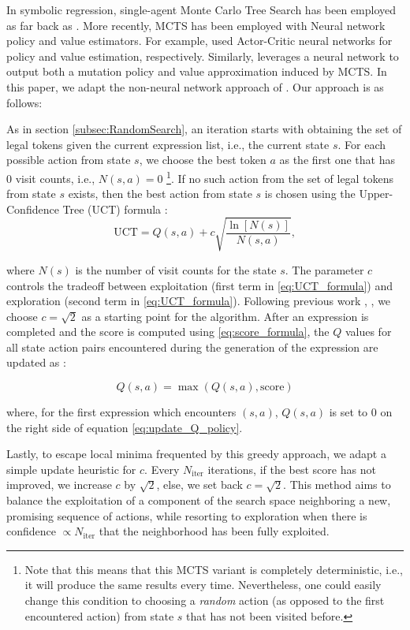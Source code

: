 \documentclass[runningheads]{llncs}
\begin{document}
In symbolic regression, single-agent Monte Carlo Tree Search has been employed as far back as \cite{CazenaveMCTS}. More recently, MCTS has been employed with Neural network policy and value estimators. For example, \cite{Lu2021} used Actor-Critic neural networks for policy and value estimation, respectively. Similarly,  \cite{10.5555/3618408.3619047} leverages a neural network to output both a mutation policy and value approximation induced by MCTS. In this paper, we adapt the non-neural network approach of \cite{sun2023symbolic}.  Our approach is as follows:
\par As in section \ref{subsec:RandomSearch}, an iteration starts with obtaining the set of legal tokens given the current expression list, i.e., the current state $s$. For each possible action from state $s$, we choose the best token $a$ as the first one that has 0 visit counts, i.e., $N(s,a) = 0$ \footnote{Note that this means that this MCTS variant is completely deterministic, i.e., it will produce the same results every time. Nevertheless, one could easily change this condition to choosing a \emph{random} action (as opposed to the first encountered action) from state $s$ that has not been visited before. }. If no such action from the set of legal tokens from state $s$ exists, then the best action from state $s$ is chosen using the Upper-Confidence Tree (UCT) formula \cite{sun2023symbolic}:
\begin{equation}
\mathrm{UCT} = Q(s,a) + c\sqrt{\frac{\ln{[N(s)]}}{N(s,a)}}, \label{eq:UCT_formula}
\end{equation}

where $N(s)$ is the number of visit counts for the state $s$. The parameter $c$ controls the tradeoff between exploitation (first term in \ref{eq:UCT_formula}) and exploration (second term in \ref{eq:UCT_formula}). Following previous work \cite{Swiechowski2023} \cite{Auer2002}, \cite{kuleshov2014algorithms} \cite{10.1007/11871842_29}, we choose $c = \sqrt{2}$ as a starting point for the algorithm. After an expression is completed and the score is computed using \ref{eq:score_formula}, the $Q$ values for all state action pairs encountered during the generation of the expression are updated as \cite{sun2023symbolic}:

\begin{equation}
Q(s,a) = \max{\left(Q(s,a), \mathrm{score}\right)} \label{eq:update_Q_policy}
\end{equation}

where, for the first expression which encounters $(s,a)$, $Q(s,a)$ is set to 0 on the right side of equation \ref{eq:update_Q_policy}. 
\par Lastly, to escape local minima frequented by this greedy approach, we adapt a simple update heuristic for $c$.  Every $N_{\mathrm{iter}}$ iterations, if the best score has not improved, we increase $c$ by $\sqrt{2}$, else, we set back $c = \sqrt{2}$. This method aims to balance the exploitation of a component of the search space neighboring a new, promising sequence of actions, while resorting to exploration when there is confidence $\propto N_{\mathrm{iter}}$ that the neighborhood has been fully exploited.
\end{document}
